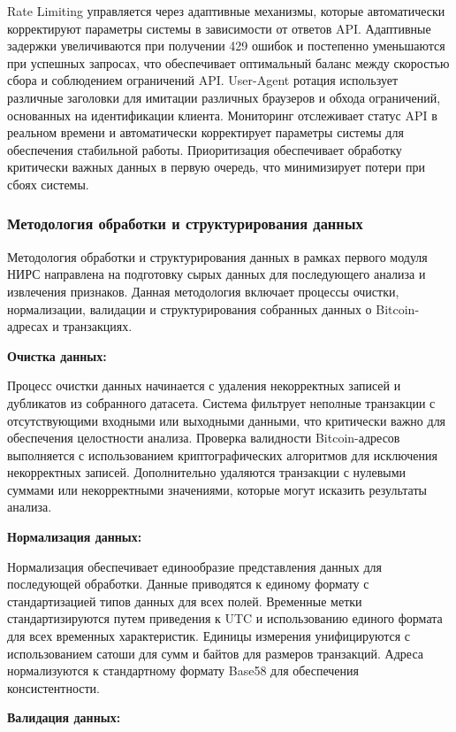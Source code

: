 Rate Limiting управляется через адаптивные механизмы, которые автоматически корректируют параметры системы в зависимости от ответов API. Адаптивные задержки увеличиваются при получении 429 ошибок и постепенно уменьшаются при успешных запросах, что обеспечивает оптимальный баланс между скоростью сбора и соблюдением ограничений API. User-Agent ротация использует различные заголовки для имитации различных браузеров и обхода ограничений, основанных на идентификации клиента. Мониторинг отслеживает статус API в реальном времени и автоматически корректирует параметры системы для обеспечения стабильной работы. Приоритизация обеспечивает обработку критически важных данных в первую очередь, что минимизирует потери при сбоях системы.

\subsubsection{Методология обработки и структурирования данных}

Методология обработки и структурирования данных в рамках первого модуля НИРС направлена на подготовку сырых данных для последующего анализа и извлечения признаков. Данная методология включает процессы очистки, нормализации, валидации и структурирования собранных данных о Bitcoin-адресах и транзакциях.

\textbf{Очистка данных:}

Процесс очистки данных начинается с удаления некорректных записей и дубликатов из собранного датасета. Система фильтрует неполные транзакции с отсутствующими входными или выходными данными, что критически важно для обеспечения целостности анализа. Проверка валидности Bitcoin-адресов выполняется с использованием криптографических алгоритмов для исключения некорректных записей. Дополнительно удаляются транзакции с нулевыми суммами или некорректными значениями, которые могут исказить результаты анализа.

\textbf{Нормализация данных:}

Нормализация обеспечивает единообразие представления данных для последующей обработки. Данные приводятся к единому формату с стандартизацией типов данных для всех полей. Временные метки стандартизируются путем приведения к UTC и использованию единого формата для всех временных характеристик. Единицы измерения унифицируются с использованием сатоши для сумм и байтов для размеров транзакций. Адреса нормализуются к стандартному формату Base58 для обеспечения консистентности.

\textbf{Валидация данных:}

